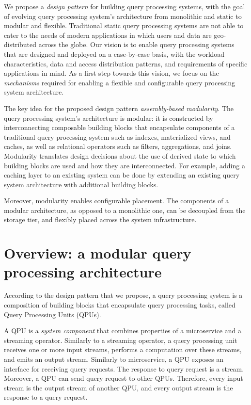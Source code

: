 
We propose a \textit{design pattern} for building query processing systems,
with the goal of evolving query processing system's architecture from monolithic and static to modular and flexible.
Traditional static query processing systems are not able to cater to the needs of modern applications in which users and
data are geo-distributed across the globe.
Our vision is to enable query processing systems that are designed and deployed on a case-by-case basis,
with the workload characteristics, data and access distribution patterns, and requirements of specific applications in
mind.
As a first step towards this vision, we focus on the \textit{mechanisms} required for enabling a flexible and configurable
query processing system architecture.

\medskip

The key idea for the proposed design pattern \textit{assembly-based modularity}.
The query processing system's architecture is modular:
it is constructed by interconnecting composable building blocks
that encapsulate components of a traditional query processing system such as indexes, materialized views,
and caches, as well as relational operators such as filters, aggregations, and joins.
Modularity translates design decisions about the use of derived state to which building blocks are used and how they are
interconnected.
For example, adding a caching layer to an existing system can be done by extending an existing query system architecture
with additional building blocks.

Moreover, modularity enables configurable placement.
The components of a modular architecture, as opposed to a monolithic one,
can be decoupled from the storage tier, and flexibly placed across the system infrastructure.


\section{Overview: a modular query processing architecture}

According to the design pattern that we propose,
a query processing system is a composition of building blocks that encapsulate query processing tasks, called
Query Processing Units (QPUs).

A QPU is a \textit{system component} that combines properties of a microservice and a streaming operator.
Similarly to a streaming operator, a query processing unit receives one or more input streams,
performs a computation over these streams, and emits an output stream.
Similarly to microservice, a QPU exposes an interface for receiving query requests.
The response to query request is a stream.
Moreover, a QPU can send query request to other QPUs.
Therefore, every input stream is the output stream of another QPU, and every output stream is the response to a query request.

